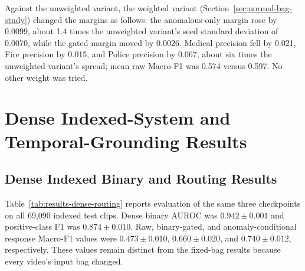 Against the unweighted variant, the weighted variant (Section~\ref{sec:normal-bag-study}) changed the margins as follows: the anomalous-only margin
rose by 0.0099, about 1.4 times the unweighted variant's seed standard
deviation of 0.0070, while the gated margin moved by 0.0026. Medical precision
fell by 0.021, Fire precision by 0.015, and Police precision by 0.067, about
six times the unweighted variant's spread; mean raw Macro-F1 was 0.574 versus
0.597. No other weight was tried.

\section{Dense Indexed-System and Temporal-Grounding Results}
\label{sec:results-dense-temporal}

\subsection{Dense Indexed Binary and Routing Results}

Table~\ref{tab:results-dense-routing} reports evaluation of the same three checkpoints on all 69,090 indexed test clips. Dense binary AUROC was $0.942 \pm 0.001$ and positive-class F1 was $0.874 \pm 0.010$. Raw, binary-gated, and anomaly-conditional response Macro-F1 values were $0.473 \pm 0.010$, $0.660 \pm 0.020$, and $0.740 \pm 0.012$, respectively. These values remain distinct from the fixed-bag results because every video's input bag changed.

